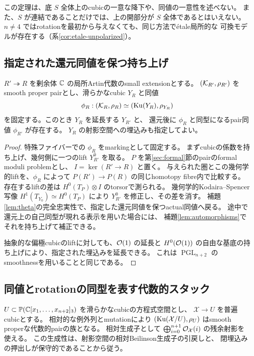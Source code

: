 この定理は、底 \(S\) 全体上のcubicの一意な降下や、同値の一意性を述べない。
また、\(S\) が連結であることだけでは、上の開部分が \(S\) 全体であるとはいえない。
\(n\ne4\) ではrotationを最初から与えなくても、同じ方法でétale局所的な
可換モデルが存在する（系\ref{cor:etale-unpolarized}）。

\subsection{指定された還元同値を保つ持ち上げ}

\begin{lemma}\label{lem:relative-realization}
 \(R'\twoheadrightarrow R\) を剰余体 \(\mathbb C\) の局所Artin代数のsmall extensionとする。
 \((\mathcal K_{R'},\rho_{R'})\) をsmooth proper pairとし、滑らかなcubic \(Y_R\) と同値
 \[
 \phi_R:(\mathcal K_R,\rho_R)\simeq(\operatorname{Ku}(Y_R),\rho_{Y_R})
 \]
 を固定する。このとき \(Y_R\) を延長する \(Y_{R'}\) と、
 還元後に \(\phi_R\) と同型になるpair同値 \(\phi_{R'}\) が存在する。
 \(Y_R\) の射影空間への埋込みも指定してよい。
\end{lemma}
\begin{proof}
 特殊ファイバーでの \(\phi_R\) をmarkingとして固定する。
 まずcubicの係数を持ち上げ、幾何側に一つのlift \(Y^0_{R'}\) を取る。
 \(P\) を第\ref{sec:formal}節のpairのformal moduli problemとし、
 \(I=\ker(R'\to R)\) と置く。
 与えられた圏とこの幾何学的liftを、\(\phi_R\) によって
 \(P(R')\to P(R)\) の同じhomotopy fibre内で比較する。
 存在するliftの差は \(H^0(T_P)\otimes I\) のtorsorで測られる。
 幾何学的Kodaira--Spencer写像
 \(H^1(T_{Y_0})\simeq H^0(T_P)\) により \(Y^0_{R'}\) を修正し、その差を消す。
 補題\ref{lem:theta}の完全忠実性で、指定した還元同値を保つactual同値へ戻る。
 途中で還元上の自己同型が現れる表示を用いた場合には、
 補題\ref{lem:automorphisms}でそれを持ち上げて補正できる。

 抽象的な偏極cubicのliftに対しても、\(\mathcal O(1)\) の延長と
 \(H^0(\mathcal O(1))\) の自由な基底の持ち上げにより、指定された埋込みを延長できる。
 これは \(\operatorname{PGL}_{n+2}\) のsmoothnessを用いることと同じである。
\end{proof}

\subsection{同値とrotationの同型を表す代数的スタック}

\(U\subset\mathbb P(\mathbb C[x_1,\ldots,x_{n+2}]_3)\) を滑らかなcubicの方程式空間とし、
 \(\mathcal X\to U\) を普遍cubicとする。
 相対的な例外列とmutationにより
 \((\operatorname{Ku}(\mathcal X/U),\rho_U)\) はsmooth properな代数的pairの族となる。
 相対生成子として \(\bigoplus_{i=0}^{n+1}\mathcal O_{\mathcal X}(i)\) の残余射影を使える。
 この生成性は、射影空間の相対Beilinson生成子の引戻しと、
 閉埋込みの押出しが保守的であることから従う。

